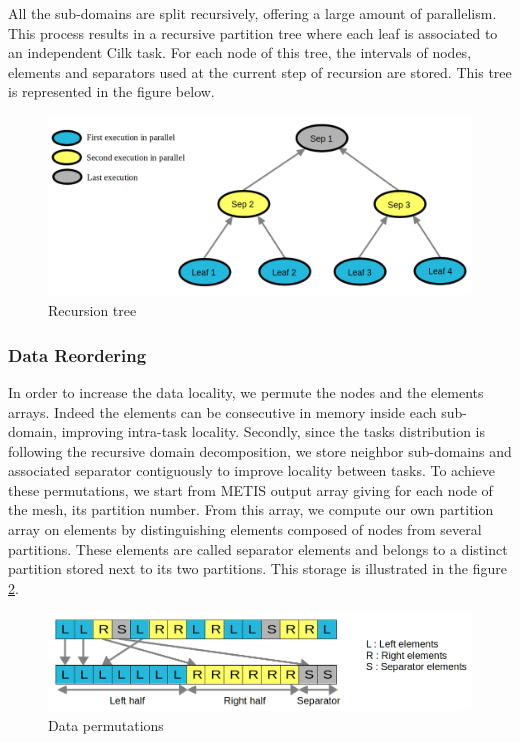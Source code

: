 \documentclass{IOS-Book-Article}
\begin{document}
All the sub-domains are split recursively, offering a large amount of parallelism.
This process results in a recursive partition tree where each leaf is associated to an independent Cilk task.
For each node of this tree, the intervals of nodes, elements and separators used at the current step of recursion are stored.
This tree is represented in the figure below.
\begin{figure}[htp]
 \centering
 \includegraphics[scale=0.25]{Recursion_tree.png}
 \caption{Recursion tree}
 \label{fig:RecTree}
\end{figure}

\subsubsection{Data Reordering}
In order to increase the data locality, we permute the nodes and the elements arrays. Indeed the elements can be consecutive in memory inside each sub-domain, improving intra-task locality.
Secondly, since the tasks distribution is following the recursive domain decomposition, we store neighbor sub-domains and associated separator contiguously to improve locality between tasks.
To achieve these permutations, we start from METIS output array giving for each node of the mesh, its partition number. From this array, we compute our own partition array on elements by distinguishing
elements composed of nodes from several partitions. These elements are called separator elements and belongs to a distinct partition stored next to its two partitions.
This storage is illustrated in the figure \ref{fig:dataPermut}.
\begin{figure}[htp]
 \centering
 \includegraphics[scale=0.25]{Data_permutations.png}
 \caption{Data permutations}
 \label{fig:dataPermut}
\end{figure}
\end{document}
